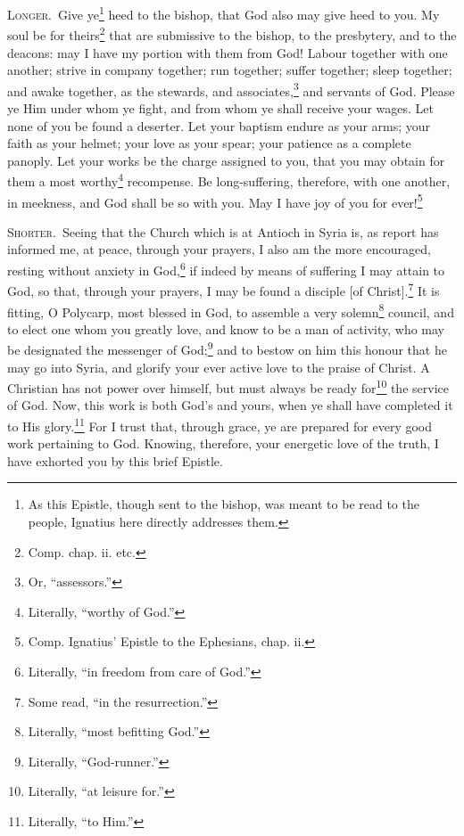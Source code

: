 \textsc{Longer.}~Give ye\footnote{As this Epistle, though sent to the bishop, was meant to be read to the people, Ignatius here directly addresses them.} heed to the bishop, that God also may give heed to you. My soul be for theirs\footnote{Comp. chap. ii. etc.} that are submissive to the bishop, to the presbytery, and to the deacons: may I have my portion with them from God! Labour together with one another; strive in company together; run together; suffer together; sleep together; and awake together, as the stewards, and associates,\footnote{Or, “assessors.”} and servants of God. Please ye Him under whom ye fight, and from whom ye shall receive your wages. Let none of you be found a deserter. Let your baptism endure as your arms; your faith as your helmet; your love as your spear; your patience as a complete panoply. Let your works be the charge assigned to you, that you may obtain for them a most worthy\footnote{Literally, “worthy of God.”} recompense. Be long-suffering, therefore, with one another, in meekness, and God shall be so with you. May I have joy of you for ever!\footnote{Comp. Ignatius’ Epistle to the Ephesians, chap. ii.}


\textsc{Shorter.}~Seeing that the Church which is at Antioch in Syria is, as report has informed me, at peace, through your prayers, I also am the more encouraged, resting without anxiety in God,\footnote{Literally, “in freedom from care of God.”} if indeed by means of suffering I may attain to God, so that, through your prayers, I may be found a disciple [of Christ].\footnote{Some read, “in the resurrection.”} It is fitting, O Polycarp, most blessed in God, to assemble a very solemn\footnote{Literally, “most befitting God.”} council, and to elect one whom you greatly love, and know to be a man of activity, who may be designated the messenger of God;\footnote{Literally, “God-runner.”} and to bestow on him this honour that he may go into Syria, and glorify your ever active love to the praise of Christ. A Christian has not power over himself, but must always be ready for\footnote{Literally, “at leisure for.”} the service of God. Now, this work is both God’s and yours, when ye shall have completed it to His glory.\footnote{Literally, “to Him.”} For I trust that, through grace, ye are prepared for every good work pertaining to God. Knowing, therefore, your energetic love of the truth, I have exhorted you by this brief Epistle.

